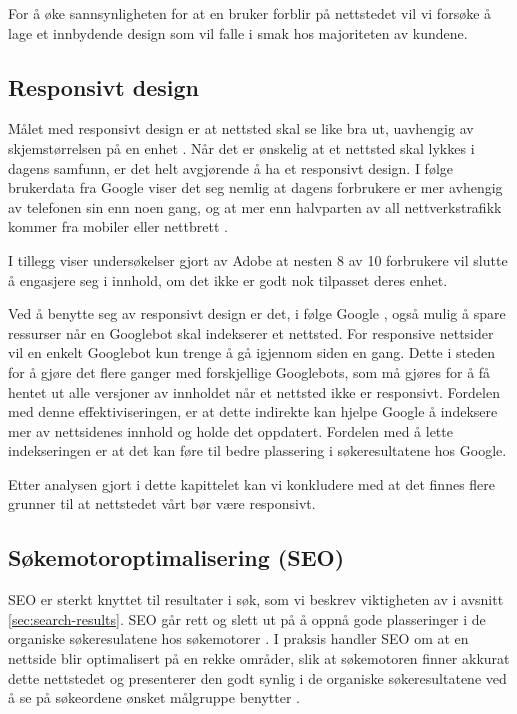 For å øke sannsynligheten for at en bruker forblir på nettstedet vil vi forsøke å lage et innbydende design som vil falle i smak hos majoriteten av kundene.


\subsection{Responsivt design}
Målet med responsivt design er at nettsted skal se like bra ut, uavhengig av skjemstørrelsen på en enhet \cite{kim2013rwd}. Når det er ønskelig at et nettsted skal lykkes i dagens samfunn, er det helt avgjørende å ha et responsivt design.  I følge brukerdata fra Google \cite{google16hms} viser det seg nemlig at dagens forbrukere er mer avhengig av telefonen sin enn noen gang, og at mer enn halvparten av all nettverkstrafikk kommer fra mobiler eller nettbrett . 

I tillegg viser undersøkelser gjort av Adobe \cite{stark2015frf} at nesten 8 av 10 forbrukere vil slutte å engasjere seg i innhold, om det ikke er godt nok tilpasset deres enhet.

Ved å benytte seg av responsivt design er det, i følge Google \cite{google2018rwd}, også mulig å spare ressurser når en Googlebot skal indekserer et nettsted. For responsive nettsider vil en enkelt Googlebot kun trenge å gå igjennom siden en gang. Dette i steden for å gjøre det flere ganger med forskjellige Googlebots, som må gjøres for å få hentet ut alle versjoner av innholdet når et nettsted ikke er responsivt. Fordelen med denne effektiviseringen, er at dette indirekte kan hjelpe Google å indeksere mer av nettsidenes innhold og holde det oppdatert. Fordelen med å lette indekseringen er at det kan føre til bedre plassering i søkeresultatene hos Google.  

Etter analysen gjort i dette kapittelet kan vi konkludere med at det finnes flere grunner til at nettstedet vårt bør være responsivt.

\subsection{Søkemotoroptimalisering (SEO)}
\label{sec:concepts-seo}
SEO er sterkt knyttet til resultater i søk, som vi beskrev viktigheten av i avsnitt \ref{sec:search-results}. SEO går rett og slett ut på å oppnå gode plasseringer i de organiske søkeresulatene hos søkemotorer \cite[s.~16]{flensted10smg}. I praksis handler SEO om at en nettside blir optimalisert på en rekke områder, slik at søkemotoren finner akkurat dette nettstedet og presenterer den godt synlig i de organiske søkeresultatene ved å se på søkeordene ønsket målgruppe benytter \cite[s.~20]{flensted10smg}.

